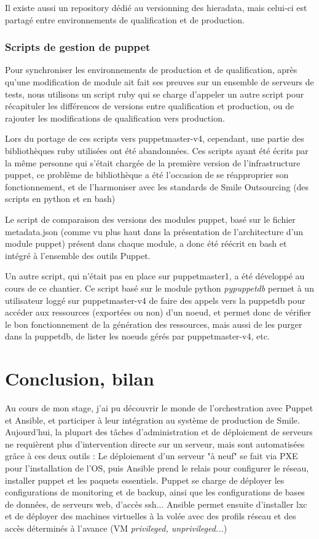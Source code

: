 \documentclass[14 pt,a4paper]{extreport}
\begin{document}
Il existe aussi un repository dédié au versionning des hieradata, mais celui-ci est partagé entre environnements de qualification et de production.

\subsection{Scripts de gestion de puppet}

Pour synchroniser les environnements de production et de qualification, après qu'une modification de module ait fait ses preuves sur un ensemble de serveurs de tests, nous utilisons un script ruby qui se charge d'appeler un autre script pour récapituler les différences de versions entre qualification et production, ou de rajouter les modifications de qualification vers production.

Lors du portage de ces scripts vers puppetmaster-v4, cependant, une partie des bibliothèques ruby utilisées ont été abandonnées. Ces scripts ayant été écrits par la même personne qui s'était chargée de la première version de l'infrastructure puppet, ce problème de bibliothèque a été l'occasion de se réapproprier son fonctionnement, et de l'harmoniser avec les standards de Smile Outsourcing (des scripts en python et en bash)

Le script de comparaison des versions des modules puppet, basé sur le fichier metadata.json (comme vu plus haut dans la présentation de l'architecture d'un module puppet) présent dans chaque module, a donc été réécrit en bash et intégré à l'ensemble des outils Puppet.

Un autre script, qui n'était pas en place sur puppetmaster1, a été développé au cours de ce chantier. Ce script basé sur le module python \emph{pypuppetdb} permet à un utilisateur loggé sur puppetmaster-v4 de faire des appels vers la puppetdb pour accéder aux ressources (exportées ou non) d'un noeud, et permet donc de vérifier le bon fonctionnement de la génération des ressources, mais aussi de les purger dans la puppetdb, de lister les noeuds gérés par puppetmaster-v4, etc.

\chapter{Conclusion, bilan}

Au cours de mon stage, j'ai pu découvrir le monde de l'orchestration avec Puppet et Ansible, et participer à leur intégration au système de production de Smile. Aujourd'hui, la plupart des tâches d'administration et de déploiement de serveurs ne requièrent plus d'intervention directe sur un serveur, mais sont automatisées grâce à ces deux outils : Le déploiement d'un serveur "à neuf" se fait via PXE pour l'installation de l'OS, puis Ansible prend le relais pour configurer le réseau, installer puppet et les paquets essentiels. Puppet se charge de déployer les configurations de monitoring et de backup, ainsi que les configurations de bases de données, de serveurs web, d'accès ssh... Ansible permet ensuite d'installer lxc et de déployer des machines virtuelles à la volée avec des profils réseau et des accès déterminés à l'avance (VM \emph{privileged, unprivileged...})
\end{document}

